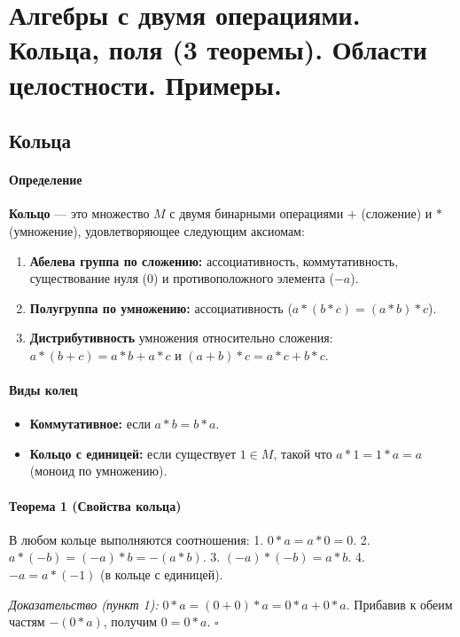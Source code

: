 \section{Алгебры с двумя операциями. Кольца, поля (3 теоремы). Области целостности. Примеры.}

\subsection*{Кольца}

\paragraph{Определение}
\textbf{Кольцо} — это множество $M$ с двумя бинарными операциями $+$ (сложение) и $\ast$ (умножение), удовлетворяющее следующим аксиомам:
\begin{enumerate}
    \item \textbf{Абелева группа по сложению:} ассоциативность, коммутативность, существование нуля ($0$) и противоположного элемента ($-a$).
    \item \textbf{Полугруппа по умножению:} ассоциативность ($a \ast (b \ast c) = (a \ast b) \ast c$).
    \item \textbf{Дистрибутивность} умножения относительно сложения: 
    $a \ast (b + c) = a \ast b + a \ast c$ и $(a + b) \ast c = a \ast c + b \ast c$.
\end{enumerate}

\paragraph{Виды колец}
\begin{itemize}
    \item \textbf{Коммутативное:} если $a \ast b = b \ast a$.
    \item \textbf{Кольцо с единицей:} если существует $1 \in M$, такой что $a \ast 1 = 1 \ast a = a$ (моноид по умножению).
\end{itemize}

\paragraph{Теорема 1 (Свойства кольца)}
В любом кольце выполняются соотношения:
1. $0 \ast a = a \ast 0 = 0$.
2. $a \ast (-b) = (-a) \ast b = -(a \ast b)$.
3. $(-a) \ast (-b) = a \ast b$.
4. $-a = a \ast (-1)$ (в кольце с единицей).

\textit{Доказательство (пункт 1):}
$0 \ast a = (0 + 0) \ast a = 0 \ast a + 0 \ast a$. Прибавив к обеим частям $-(0 \ast a)$, получим $0 = 0 \ast a$. $\square$

